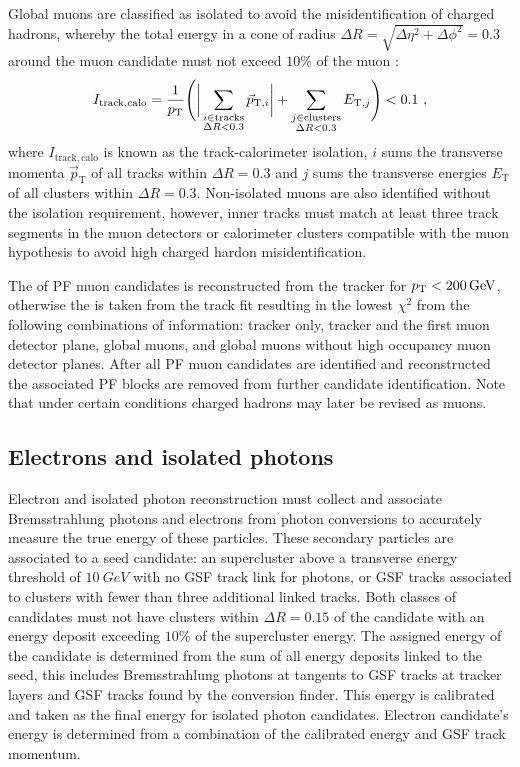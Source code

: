 Global muons are classified as isolated to avoid the misidentification of charged hadrons, whereby the total energy in a cone of radius ${\Delta R=\sqrt{\Delta\eta^2+\Delta\phi^2}=0.3}$ around the muon candidate must not exceed $10\%$ of the muon \pt:
%
\begin{equation}
    I_{\mathrm{track,calo}} = \frac{1}{\pt}\Biggl(\bigg|\sum_{\substack{i\in \mathrm{tracks}\\\Delta R<0.3}} \vec{p}_{\mathrm{T},i}\bigg| + \sum_{\substack{j\in \mathrm{clusters}\\\Delta R<0.3}}E_{\mathrm{T},j}\Biggr) < 0.1\ ,
\end{equation}
%
where $I_{\mathrm{track,calo}}$ is known as the track-calorimeter isolation, $i$ sums the transverse momenta $\vec{p}_{\mathrm{T}}$ of all tracks within $\Delta R=0.3$ and $j$ sums the transverse energies $E_{\mathrm{T}}$ of all clusters within $\Delta R=0.3$.  Non-isolated muons are also identified without the isolation requirement, however, inner tracks must match at least three track segments in the muon detectors or calorimeter clusters compatible with the muon hypothesis to avoid high \pt charged hardon misidentification.

The \pt of PF muon candidates is reconstructed from the tracker for ${p_{\text{T}}<\SI{200}{GeV}}$, otherwise the \pt is taken from the track fit resulting in the lowest $\chi^2$ from the following combinations of information: tracker only, tracker and the first muon detector plane, global muons, and global muons without high occupancy muon detector planes. After all PF muon candidates are identified and reconstructed the associated PF blocks are removed from further candidate identification. Note that under certain conditions charged hadrons may later be revised as muons.


\subsection{Electrons and isolated photons}

Electron and isolated photon reconstruction must collect and associate Bremsstrahlung photons and electrons from photon conversions to accurately measure the true energy of these particles. These secondary particles are associated to a seed candidate: an \ECAL supercluster above a transverse energy threshold of ${\SI{10}{GeV}}$ with no GSF track link for photons, or GSF tracks associated to \ECAL clusters with fewer than three additional linked tracks. Both classes of candidates must not have \HCAL clusters within ${\Delta R=0.15}$ of the candidate with an energy deposit exceeding $10\%$ of the supercluster energy. The assigned energy of the candidate is determined from the sum of all energy deposits linked to the seed, this includes Bremsstrahlung photons at tangents to GSF tracks at tracker layers and GSF tracks found by the conversion finder. This energy is calibrated and taken as the final energy for isolated photon candidates. Electron candidate's energy is determined from a combination of the calibrated \ECAL energy and GSF track momentum.

